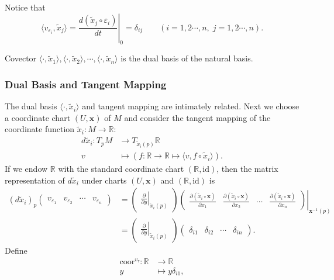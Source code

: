 \documentclass{report}
\begin{document}
Notice that
\[
    \langle v_{\varepsilon_i},\tilde{x}_j\rangle=\left.\frac{d(\tilde{x}_j\circ\varepsilon_i)}{dt}\right|_0=\delta_{ij}\qquad(i=1,2\cdots,n,\;j=1,2\cdots,n).
\]

Covector $\langle\cdot,\tilde{x}_1\rangle,\langle\cdot,\tilde{x}_2\rangle,\cdots,\langle\cdot,\tilde{x}_n\rangle$ is the dual basis of the natural basis.

\subsubsection{Dual Basis and Tangent Mapping}
The dual basis $\langle\cdot,\tilde{x}_i\rangle$ and tangent mapping are intimately related. 
Next we choose a coordinate chart $(U,\mathbf{x})$ of $M$ and consider the tangent mapping of the coordinate function $\tilde{x}_i: M\to \mathbb{R}$:
\[
    \begin{aligned}
        d\tilde{x}_i:T_pM&\longrightarrow T_{\tilde{x}_i(p)}\mathbb{R}\\
        v&\longmapsto \left(f:\mathbb{R}\to \mathbb{R} \longmapsto\langle v,f\circ \tilde{x}_i\rangle\right).
    \end{aligned}
\]
If we endow $\mathbb{R}$ with the standard coordinate chart $(\mathbb{R},\mathrm{id})$, then the matrix representation of $d\tilde{x}_i$ under charts $(U,\mathbf{x})$ and $(\mathbb{R},\mathrm{id})$ is
\[
    \begin{aligned}
    (d\tilde{x}_i)_p
    \begin{pmatrix}
    v_{\varepsilon_1}&v_{\varepsilon_2}&\cdots&v_{\varepsilon_n}
    \end{pmatrix}
    &=
    \begin{pmatrix}
        \left.\frac{\partial}{\partial y}\right|_{\tilde{x}_i(p)}
    \end{pmatrix}
    \left.\begin{pmatrix}
        \frac{\partial(\tilde{x}_i\circ\mathbf{x})}{\partial
x_1}&\frac{\partial(\tilde{x}_i\circ\mathbf{x})}{\partial
x_2}&\cdots&\frac{\partial(\tilde{x}_i\circ\mathbf{x})}{\partial x_n}
    \end{pmatrix}\right|_{\mathbf{x}^{-1}(p)}\\
    &=\begin{pmatrix}
        \left.\frac{\partial}{\partial y}\right|_{\tilde{x}_i(p)}
    \end{pmatrix}
    \begin{pmatrix}
        \delta_{i1} &\delta_{i2}&\cdots&\delta_{in}
    \end{pmatrix}.
    \end{aligned}
    \]
Define
\[
    \begin{aligned}
        \mathrm{coor}^{v_{\tau}}:\mathbb{R}&\longrightarrow\mathbb{R}\\
        y&\longmapsto y\delta_{i1},
    \end{aligned}
\]
\end{document}
